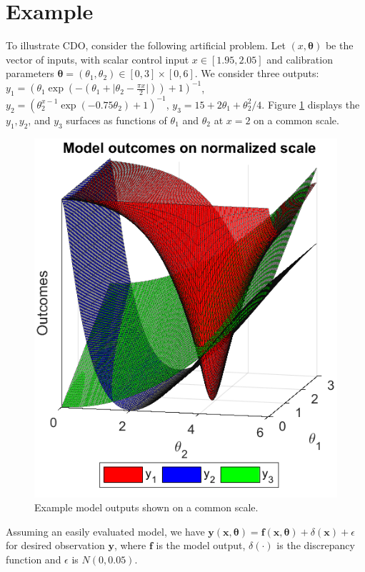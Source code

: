 \documentclass{article}
\begin{document}
\section{Example}\label{example}
To illustrate CDO, consider the following artificial problem. 
%
Let $(x,\boldsymbol \theta)$ be the vector of inputs, with scalar control input $x\in[1.95,2.05]$ and calibration parameters $\boldsymbol \theta = (\theta_1,\theta_2)\in[0,3]\times[0,6]$.
%
We consider three outputs:
%
$
y_1 = \left(\theta_1 \exp\left(-\left(\theta_1 + \lvert \theta_2-\frac{\pi x}2\rvert \right)\right)+1\right)^{-1}$, 
$
y_2 = \left(\theta_2^{x-1} \exp\left(-0.75 \theta_2\right) + 1 \right)^{-1}
$, 
$
y_3 = 15 + 2 \theta_1 + {\theta_2^2}/4.
$
%
Figure \ref{fig:toy_sim_outputs} displays the $y_1, y_2$, and $y_3$ surfaces as functions of $\theta_1$ and $\theta_2$ at $x = 2$ on a common scale.
%
\begin{figure}
\centering
\includegraphics[width=.4\linewidth]{FIG_toy_sim_model_outputs}
\captionsetup{width=.4\linewidth}
\caption{Example model outputs shown on a common scale.}
\label{fig:toy_sim_outputs}
\end{figure}
%
Assuming an easily evaluated model, we have
%
$
\mathbf y(\mathbf x, \boldsymbol\theta) = \mathbf f(\mathbf x,\boldsymbol \theta) + \delta(\mathbf x) + \epsilon
$
%
for desired observation $\mathbf y$, where $\mathbf f$ is the model output, $\delta(\cdot)$ is the discrepancy function and $\epsilon$ is $N(0,0.05)$.
\end{document}
